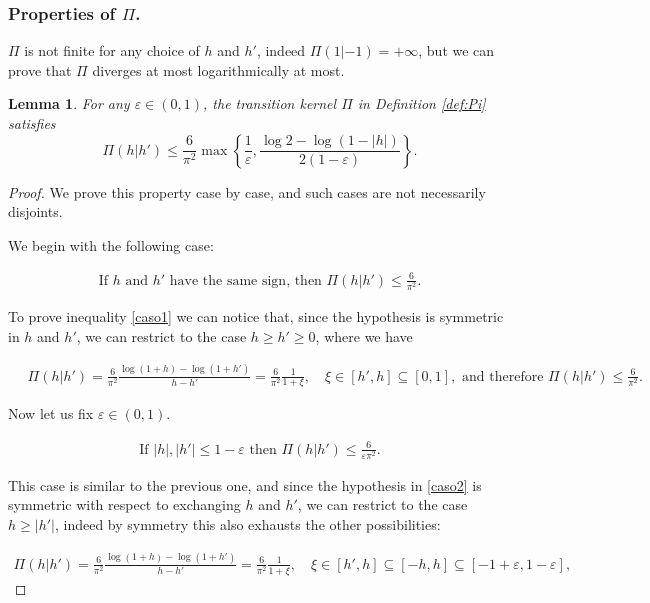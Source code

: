 \documentclass[a4paper,10pt,reqno]{amsart}
\newtheorem{lemma}{Lemma}[section]
\numberwithin{equation}{subsection}
\numberwithin{figure}{subsection}
\begin{document}
\subsubsection{Properties of $\Pi$.}
$\Pi$ is not finite for any choice of $h$ and $h'$, indeed $\Pi(1|-1)=+\infty$, but we can prove that $\Pi$ diverges at most logarithmically at most.
\begin{lemma}\label{divPi}
For any $\varepsilon\in(0,1)$, the transition kernel $\Pi$ in Definition \ref{def:Pi} satisfies
\[
\Pi(h|h')\leq\frac{6}{\pi^2}\max\left\{\frac{1}{\varepsilon},\frac{\log 2-\log(1-|h|)}{2(1-\varepsilon)}\right\}.
\]
\end{lemma}
\begin{proof}
We prove this property case by case, and such cases are not necessarily disjoints.

We begin with the following case:

\begin{align}\label{caso1}
\textrm{If }h\textrm{ and }h'\textrm{ have the same sign, then } \Pi(h|h')\leq\frac{6}{\pi^2}.
\end{align}

To prove inequality \eqref{caso1} we can notice that, since the hypothesis is symmetric in $h$ and $h'$, we can restrict to the case $h\geq h'\geq0$, where we have

{\scriptsize\begin{align*}
\quad\Pi(h|h')=\frac{6}{\pi^2}\frac{\log(1+h)-\log(1+h')}{h-h'}=\frac{6}{\pi^2}\frac{1}{1+\xi},\quad\xi\in[h',h]\subseteq[0,1],\textrm{ and therefore }\Pi(h|h')\leq\frac{6}{\pi^2}.
\end{align*}}

Now let us fix $\varepsilon\in(0,1)$.

\begin{align}\label{caso2}
\textrm{If }|h|,|h'|\leq1-\varepsilon\textrm{ then }\Pi(h|h')\leq\frac{6}{\varepsilon\pi^2}.
\end{align}

This case is similar to the previous one, and since the hypothesis in \eqref{caso2} is symmetric with respect to exchanging $h$ and $h'$, we can restrict to the case $h\geq |h'|$, indeed by symmetry this also exhausts the other possibilities:

{\footnotesize\begin{align*}
\Pi(h|h')=\frac{6}{\pi^2}\frac{\log(1+h)-\log(1+h')}{h-h'}=\frac{6}{\pi^2}\frac{1}{1+\xi},\quad\xi\in[h',h]\subseteq[-h,h]\subseteq[-1+\varepsilon,1-\varepsilon],
\end{align*}}


\end{proof}
\end{document}
